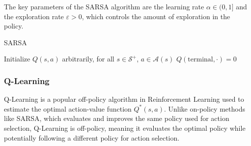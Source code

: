 The key parameters of the SARSA algorithm are the learning rate $\alpha\in(0,1]$ and the exploration rate $\varepsilon>0$, which controls the amount of exploration in the policy.
\begin{algorithm}[H]
    \caption{SARSA}
        \begin{algorithmic}[1]
            \State Initialize $Q(s,a)$ arbitrarily, for all $s\in\mathcal{S}^{+}$, $a \in \mathcal{A}(s)$
            \State $Q(\text{terminal},\cdot)=0$
            \Loop
            \EndLoop
        \end{algorithmic}
\end{algorithm}

\subsubsection{Q-Learning}
Q-Learning is a popular off-policy algorithm in Reinforcement Learning used to estimate the optimal action-value function $Q^\ast(s,a)$. 
Unlike on-policy methods like SARSA, which evaluates and improves the same policy used for action selection, Q-Learning is off-policy, meaning it evaluates the optimal policy while potentially following a different policy for action selection.

